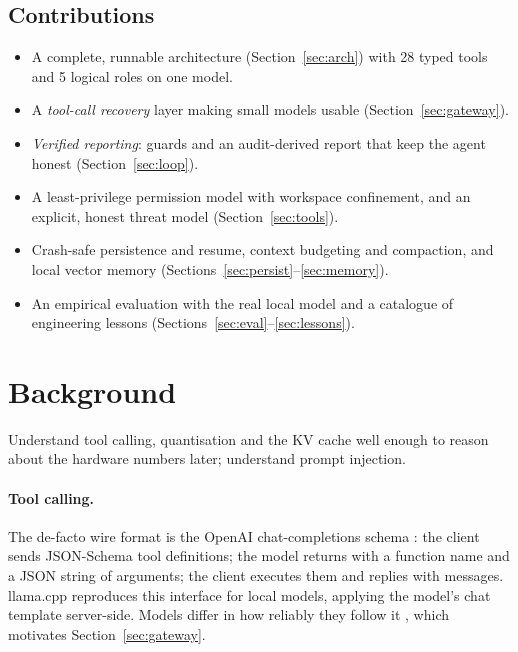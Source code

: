 \documentclass[11pt,a4paper]{article}
\newcommand{\code}[1]{\texttt{\detokenize{#1}}}
\begin{document}
\subsection{Contributions}
\begin{itemize}[nosep]
  \item A complete, runnable architecture (Section~\ref{sec:arch}) with 28 typed tools and 5 logical roles on one model.
  \item A \emph{tool-call recovery} layer making small models usable (Section~\ref{sec:gateway}).
  \item \emph{Verified reporting}: guards and an audit-derived report that keep the agent honest (Section~\ref{sec:loop}).
  \item A least-privilege permission model with workspace confinement, and an explicit, honest threat model (Section~\ref{sec:tools}).
  \item Crash-safe persistence and resume, context budgeting and compaction, and local vector memory (Sections~\ref{sec:persist}--\ref{sec:memory}).
  \item An empirical evaluation with the real local model and a catalogue of engineering lessons (Sections~\ref{sec:eval}--\ref{sec:lessons}).
\end{itemize}

\section{Background}
\begin{objectives}
Understand tool calling, quantisation and the KV cache well enough to reason about the hardware numbers later; understand prompt injection.
\end{objectives}

\paragraph{Tool calling.} The de-facto wire format is the OpenAI chat-completions schema \citep{openaitools}: the client sends JSON-Schema tool definitions; the model returns
\code{tool_calls} with a function name and a JSON string of arguments; the client executes them and replies with \code{tool} messages.
llama.cpp \citep{llamacpp} reproduces this interface for local models, applying the model's chat template server-side.
Models differ in how reliably they follow it \citep{schick2023toolformer}, which motivates Section~\ref{sec:gateway}.
\end{document}
